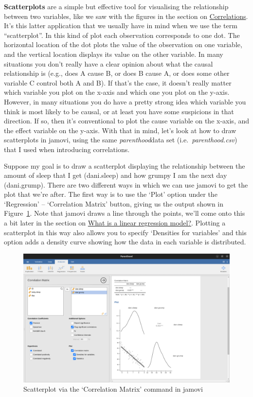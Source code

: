 \documentclass[
  a4paper,
]{book}
\begin{document}
\textbf{Scatterplots} are a simple but effective tool for visualising
the relationship between two variables, like we saw with the figures in
the section on \protect\hyperlink{correlations}{Correlations}. It's this
latter application that we usually have in mind when we use the term
``scatterplot''. In this kind of plot each observation corresponds to
one dot. The horizontal location of the dot plots the value of the
observation on one variable, and the vertical location displays its
value on the other variable. In many situations you don't really have a
clear opinion about what the causal relationship is (e.g., does A cause
B, or does B cause A, or does some other variable C control both A and
B). If that's the case, it doesn't really matter which variable you plot
on the x-axis and which one you plot on the y-axis. However, in many
situations you do have a pretty strong idea which variable you think is
most likely to be causal, or at least you have some suspicions in that
direction. If so, then it's conventional to plot the cause variable on
the x-axis, and the effect variable on the y-axis. With that in mind,
let's look at how to draw scatterplots in jamovi, using the same
\emph{parenthood}data set (i.e.~\emph{parenthood.csv}) that I used when
introducing correlations.

Suppose my goal is to draw a scatterplot displaying the relationship
between the amount of sleep that I get (dani.sleep) and how grumpy I am
the next day (dani.grump). There are two different ways in which we can
use jamovi to get the plot that we're after. The first way is to use the
`Plot' option under the `Regression' -- `Correlation Matrix' button,
giving us the output shown in Figure~\ref{fig-fig12-8}. Note that jamovi
draws a line through the points, we'll come onto this a bit later in the
section on \protect\hyperlink{what-is-a-linear-regression-model}{What is
a linear regression model?}. Plotting a scatterplot in this way also
allows you to specify `Densities for variables' and this option adds a
density curve showing how the data in each variable is distributed.

\begin{figure}[h!]

\includegraphics[width=1\textwidth,height=\textheight]{images/fig12-8.png} \hfill{}

\caption{\label{fig-fig12-8}Scatterplot via the `Correlation Matrix'
command in jamovi}

\end{figure}
\end{document}
